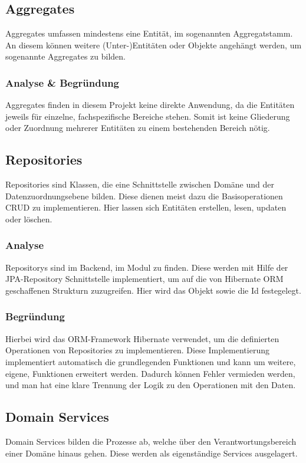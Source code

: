     \subsection{Aggregates}
    Aggregates umfassen mindestens eine Entität, im sogenannten Aggregatstamm. An diesem können weitere (Unter-)Entitäten oder Objekte angehängt werden, um sogenannte Aggregates zu bilden.

        \subsubsection{Analyse \& Begründung}
        Aggregates finden in diesem Projekt keine direkte Anwendung, da die Entitäten jeweils für einzelne, fachspezifische Bereiche stehen. Somit ist keine Gliederung oder Zuordnung mehrerer Entitäten zu einem bestehenden Bereich nötig.

    \subsection{Repositories}
    Repositories sind Klassen, die eine Schnittstelle zwischen Domäne und der Datenzuordnungsebene bilden. Diese dienen meist dazu die Basisoperationen CRUD zu implementieren. Hier lassen sich Entitäten erstellen, lesen, updaten oder löschen.
    
        \subsubsection{Analyse}
        Repositorys sind im Backend, im Modul  zu finden. Diese werden mit Hilfe der JPA-Repository Schnittstelle implementiert, um auf die von Hibernate ORM geschaffenen Strukturn zuzugreifen. Hier wird das Objekt sowie die Id festegelegt.

        \subsubsection{Begründung}
        Hierbei wird das ORM-Framework Hibernate verwendet, um die definierten Operationen von Repositories zu implementieren. Diese Implementierung implementiert automatisch die grundlegenden Funktionen und kann um weitere, eigene, Funktionen erweitert werden. Dadurch können Fehler vermieden werden, und man hat eine klare Trennung der Logik zu den Operationen mit den Daten.
        
    \subsection{Domain Services}
    Domain Services bilden die Prozesse ab, welche über den Verantwortungsbereich einer Domäne hinaus gehen. Diese werden als eigenständige Services ausgelagert.


